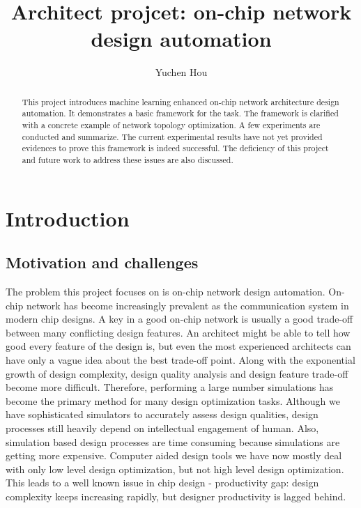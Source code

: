 \documentclass[12pt]{article}
\theoremstyle{definition}
\begin{document}
\title{Architect projcet: on-chip network design automation}
\author{Yuchen Hou}
\maketitle

\begin{abstract}
  This project introduces machine learning enhanced on-chip network architecture design automation. It demonstrates a basic framework for the task. The framework is clarified with a concrete example of network topology optimization. A few experiments are conducted and summarize. The current experimental results have not yet provided evidences to prove this framework is indeed successful. The deficiency of this project and future work to address these issues are also discussed.
\end{abstract}

\section{Introduction}
\subsection{Motivation and challenges}
The problem this project focuses on is on-chip network design automation. On-chip network has become increasingly prevalent as the communication system in modern chip designs. A key in a good on-chip network is usually a good trade-off between many conflicting design features. An architect might be able to tell how good every feature of the design is, but even the most experienced architects can have only a vague idea about the best trade-off point. Along with the exponential growth of design complexity, design quality analysis and design feature trade-off become more difficult. Therefore, performing a large number simulations has become the primary method for many design optimization tasks. Although we have sophisticated simulators \cite{amoretti2014modeling} \cite{jiang2013detailed} to accurately assess design qualities, design processes still heavily depend on intellectual engagement of human. Also, simulation based design processes are time consuming because simulations are getting more expensive. Computer aided design tools we have now mostly deal with only low level design optimization, but not high level design optimization. This leads to a well known issue in chip design - productivity gap: design complexity keeps increasing rapidly, but designer productivity is lagged behind.
\end{document}
